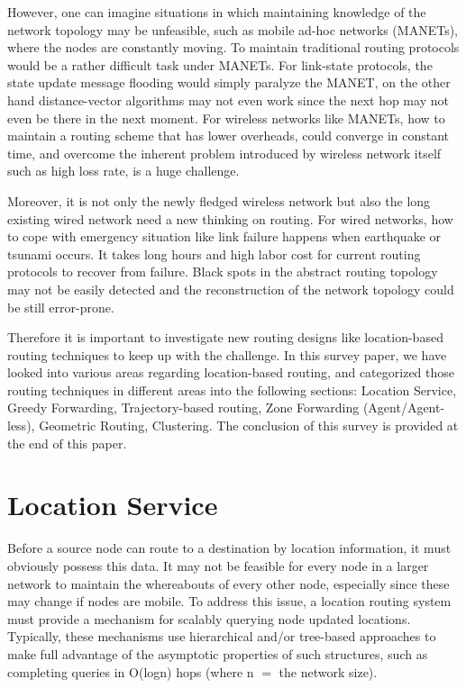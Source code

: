 \documentclass[conference]{IEEEtran}
\begin{document}
However, one can imagine situations in which maintaining knowledge of the network topology may be unfeasible, such as mobile ad-hoc networks (MANETs), where the nodes are constantly moving. To maintain traditional routing protocols would be a rather difficult task under MANETs. For link-state protocols, the state update message flooding would simply paralyze the MANET, on the other hand distance-vector algorithms may not even work since the next hop may not even be there in the next moment. For wireless networks like MANETs, how to maintain a routing scheme that has lower overheads, could converge in constant time, and overcome the inherent problem introduced by wireless network itself such as high loss rate, is a huge challenge.

Moreover, it is not only the newly fledged wireless network but also the long existing wired network need a new thinking on routing. For wired networks, how to cope with emergency situation like link failure happens when earthquake or tsunami occurs. It takes long hours and high labor cost for current routing protocols to recover from failure. Black spots in the abstract routing topology may not be easily detected and the reconstruction of the network topology could be still error-prone.

Therefore it is important to investigate new routing designs like location-based routing techniques to keep up with the challenge. In this survey paper, we have looked into various areas regarding location-based routing, and categorized those routing techniques in different areas into the following sections: Location Service,  Greedy Forwarding, Trajectory-based routing, Zone Forwarding (Agent/Agent-less),   Geometric Routing, Clustering. The conclusion of this survey is provided at the end of this paper.



\section{Location Service}

Before a source node can route to a destination by location information, it must obviously possess this data.
It may not be feasible for every node in a larger network to maintain the whereabouts of every other node, especially since these may change if nodes are mobile.
To address this issue, a location routing system must provide a mechanism for scalably querying node updated locations.
Typically, these mechanisms use hierarchical and/or tree-based approaches to make full advantage of the asymptotic properties of such structures, such as completing queries in O(logn) hops (where n $=$ the network size).
\end{document}
